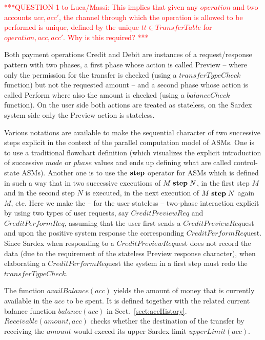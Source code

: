\vspace{12pt}
\textcolor{red}{***QUESTION 1 to Luca/Massi: This implies that given any $operation$ and two accounts $acc,acc'$, the channel through which the operation is allowed to be performed is unique, defined by the unique $tt \in TransferTable$ for $operation,acc,acc'$. Why is this required? ***}
\vspace{12pt}

Both payment operations Credit and Debit are instances of a request/response pattern with two phases, a first phase whose action is called Preview -- where only the permission for the transfer is checked (using a $transferTypeCheck$ function) but not the requested amount -- and  a second phase whose action is called Perform where also the amount is checked (using a $balanceCheck$ function). On the user side both actions are treated as stateless, on the Sardex system side only the Preview action is stateless. 

Various notations are available to make the sequential character of two successive steps explicit in the context of the parallel computation model of ASMs. One is to use a traditional flowchart definition (which visualizes the explicit introduction of successive $mode$ or $phase$ values and ends up defining what are called control-state ASMs). Another one is to use the $\mathrel{\mathbf{step}}$ operator for ASMs which is defined in such a way that in two successive executions of $M \mathrel{\mathbf{step}} N$, in the first step $M$ and in the second step $N$ is executed, in the next execution of  $M \mathrel{\mathbf{step}} N $ again $M$, etc. Here we make the -- for the user stateless -- two-phase interaction explicit by using two  types of user requests, say $CreditPreviewReq$ and $CreditPerformReq$, assuming that the user first sends a $CreditPreviewReq$uest and upon the positive system response the corresponding $CreditPerformReq$uest. Since Sardex when responding to a $CreditPreviewReq$uest does not record the data (due to the requirement of the stateless Preview response character), when elaborating a $CreditPerformReq$uest the system in a first step must redo the $transferTypeCheck$. 

The function $availBalance(acc)$ yields the amount of money that is currently available in the $acc$ to be spent. It is defined together with the related current balance function $balance(acc)$ in Sect.~\ref{sect:accHistory}. $Receivable(amount,acc)$ checks whether the destination of the transfer by receiving the $amount$ would exceed its upper Sardex limit $upperLimit(acc)$.

